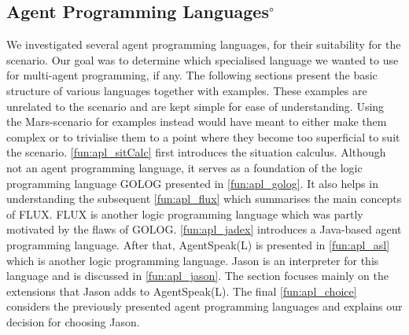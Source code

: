 \subsection[Agent Programming Languages]{Agent Programming Languages$^\circ$}
We investigated several agent programming languages, for their suitability for the \mars scenario.
Our goal was to determine which specialised language we wanted to use for multi-agent programming, if any.
The following sections present the basic structure of various languages together with examples.
These examples are unrelated to the \mars scenario and are kept simple for ease of understanding.
Using the Mars-scenario for examples instead would have meant to either make them complex or to trivialise them to a point where they become too superficial to suit the scenario.
\autoref{fun:apl_sitCalc} first introduces the situation calculus.
Although not an agent programming language, it serves as a foundation of the logic programming language GOLOG presented in \autoref{fun:apl_golog}.
It also helps in understanding the subsequent \autoref{fun:apl_flux} which summarises the main concepts of FLUX.
FLUX is another logic programming language which was partly motivated by the flaws of GOLOG.
\autoref{fun:apl_jadex} introduces a Java-based agent programming language.
After that, AgentSpeak(L) is presented in \autoref{fun:apl_asl} which is another logic programming language.
Jason is an interpreter for this language and is discussed in \autoref{fun:apl_jason}.
The section focuses mainly on the extensions that Jason adds to AgentSpeak(L).
The final \autoref{fun:apl_choice} considers the previously presented agent programming languages and explains our decision for choosing Jason.















